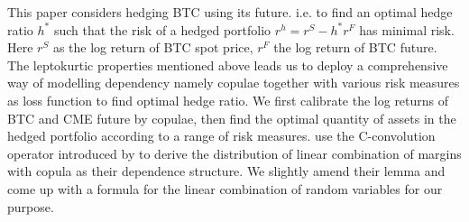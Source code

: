 \documentclass[11pt,a4paper,english]{article}
\providecommand{\natp}[1]{\textcolor{darkorange}{#1}}
\begin{document}
This paper considers hedging BTC using its future. %
i.e. to find an optimal hedge ratio $h^*$ such that the risk of a hedged portfolio $r^h = r^S - h^*r^F$ has
minimal risk.
Here $r^S$ as the log return of BTC spot price, $r^F$ the log return of BTC future.
The leptokurtic properties mentioned above leads us to deploy a comprehensive way of modelling dependency namely copulae together with various risk measures as loss function to find optimal hedge ratio.
We first calibrate the log returns of BTC and CME future by copulae,
then find the optimal quantity of assets in the hedged portfolio according to a range of risk measures.
\citet{barbi2014copula} use the C-convolution operator introduced by \citet{cherubini2011copula} to derive the distribution
of linear combination of margins with copula as their dependence structure.
We slightly amend their lemma and come up with a formula for the linear combination of random variables for our purpose.\medskip
%
%
\end{document}
